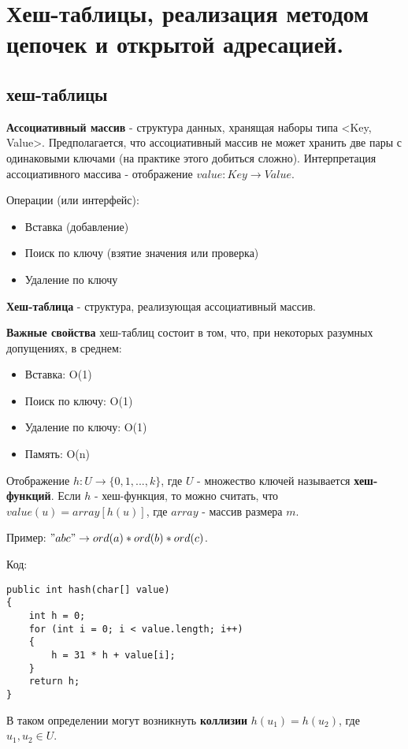 \section{Хеш-таблицы, реализация методом цепочек и открытой адресацией.}

\subsection*{хеш-таблицы}

{\bf Ассоциативный массив} - структура данных, хранящая наборы типа <Key, Value>. 
Предполагается, что ассоциативный массив не может хранить две пары с одинаковыми ключами (на практике этого добиться сложно).
Интерпретация ассоциативного массива - отображение $value: Key \rightarrow Value$.

Операции (или интерфейс):
\begin{itemize}
\item Вставка (добавление)
\item Поиск по ключу (взятие значения или проверка)
\item Удаление по ключу
\end{itemize}

{\bf Хеш-таблица} - структура, реализующая ассоциативный массив.

{\bf Важные свойства} хеш-таблиц состоит в том, что, при некоторых разумных допущениях, в среднем:
\begin{itemize}
\item Вставка: O(1)
\item Поиск по ключу: O(1)
\item Удаление по ключу: O(1)
\item Память: O(n)
\end{itemize}

Отображение $h: U \rightarrow \{0, 1, ..., k\}$, где $U$ - множество ключей называется {\bf хеш-функций}.
Если $h$ - хеш-функция, то можно считать, что $value(u) = array[h(u)]$, где $array$ - массив размера $m$.

Пример:
$"abc" \rightarrow ord(a)*ord(b)*ord(c)$.

Код:
\begin{verbatim}
public int hash(char[] value) 
{
	int h = 0;
	for (int i = 0; i < value.length; i++) 
	{
		h = 31 * h + value[i];
	}
	return h;
}
\end{verbatim}

В таком определении могут возникнуть {\bf коллизии} $h(u_1) = h(u_2)$, где $u_1, u_2 \in U$.

